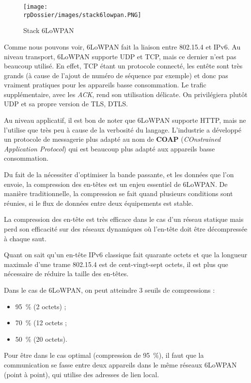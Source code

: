 \begin{figure}[H]
\centering
\texttt{[image: \\rpDossier/images/stack6lowpan.PNG]}
\caption{Stack 6LoWPAN}
\label{stack6lowpan}
\end{figure}

Comme nous pouvons voir, 6LoWPAN fait la liaison entre 802.15.4 et IPv6. Au niveau transport, 6LoWPAN supporte UDP et TCP, mais ce dernier n'est pas beaucoup utilisé. En effet, TCP étant un protocole connecté, les entête sont très grands (à cause de l'ajout de numéro de séquence par exemple) et donc pas vraiment pratiques pour les appareils basse consommation. Le trafic supplémentaire, avec les \textit{ACK}, rend son utilisation délicate. On privilégiera plutôt UDP et sa propre version de TLS, DTLS. 

Au niveau applicatif, il est bon de noter que 6LoWPAN supporte HTTP, mais ne l'utilise que très peu à cause de la verbosité du langage. L'industrie a développé un protocole de messagerie plus adapté au nom de \textbf{COAP} (\textit{COnstrained Application Protocol}) qui est beaucoup plus adapté aux appareils basse consommation.

Du fait de la nécessiter d'optimiser la bande passante, et les données que l'on envoie, la compression des en-têtes est un enjeu essentiel de 6LoWPAN. De manière traditionnelle, la compression se fait quand plusieurs conditions sont réunies, si le flux de données entre deux équipements est stable.

La compression des en-tête est très efficace dans le cas d’un réseau statique mais perd son efficacité sur des réseaux dynamiques où l'en-tête doit être décompressée à chaque saut.

Quant on sait qu'un en-tête IPv6 classique fait quarante octets et que la longueur maximale d'une trame 802.15.4 est de cent-vingt-sept octets, il est plus que nécessaire de réduire la taille des en-têtes.

Dans le cas de 6LoWPAN, on peut atteindre 3 seuils de compressions :
\begin{itemize}
	\item 95~\% (2 octets) ;
	\item 70~\% (12 octets ;
	\item 50~\% (20 octets).
\end{itemize}

Pour être dans le cas optimal (compression de 95~\%), il faut que la communication se fasse entre deux appareils dans le même réseaux 6LoWPAN (point à point), qui utilise des adresses de lien local.

